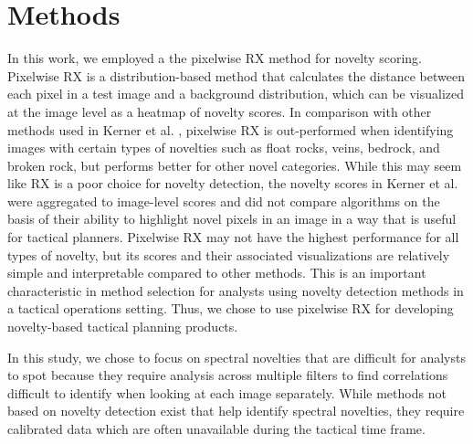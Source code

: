 \section{Methods}
In this work, we employed a the pixelwise RX method for novelty scoring.
Pixelwise RX is a distribution-based method that calculates the distance between each pixel in a test image and a background distribution, which can be visualized at the image level as a heatmap of novelty scores. 
In comparison with other methods used in Kerner et al. \cite{kerner2020comparison}, pixelwise RX is out-performed when identifying images with certain types of novelties such as float rocks, veins, bedrock, and broken rock, but performs better for other novel categories. 
While this may seem like RX is a poor choice for novelty detection, the novelty scores in Kerner et al. were aggregated to image-level scores and did not compare algorithms on the basis of their ability to highlight novel pixels in an image in a way that is useful for tactical planners. 
Pixelwise RX may not have the highest performance for all types of novelty, but its scores and their associated visualizations are relatively simple and interpretable compared to other methods. 
This is an important characteristic in method selection for analysts using novelty detection methods in a tactical operations setting. Thus, we chose to use pixelwise RX for developing novelty-based tactical planning products. 

In this study, we chose to focus on spectral novelties that are difficult for analysts to spot because they require analysis across multiple filters to find correlations difficult to identify when looking at each image separately. 
While methods not based on novelty detection exist that help identify spectral novelties, they require calibrated data which are often unavailable during the tactical time frame. 


